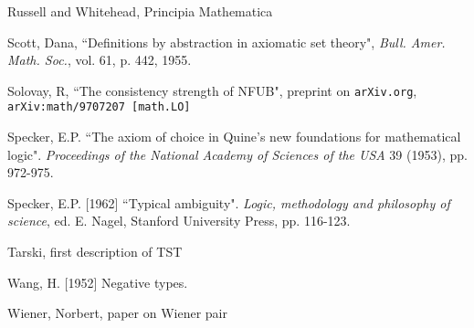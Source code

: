 \documentclass[112pt]{article}
\begin{document}
\begin{thebibliography}{99}
  Russell and Whitehead, Principia Mathematica

  Scott, Dana, ``Definitions by abstraction in axiomatic set theory",  {\em Bull. Amer. Math.
Soc.}, vol. 61, p. 442, 1955.

  Solovay, R, ``The consistency strength of NFUB",  preprint on {\tt arXiv.org}, {\tt arXiv:math/9707207 [math.LO]}

  Specker, E.P.
``The axiom of choice in Quine's new foundations for mathematical logic". 
{\em Proceedings of the National Academy of Sciences of the USA\/} 39 (1953), pp. 972-975.

  Specker, E.P. [1962] 
``Typical ambiguity". 
{\em Logic, methodology and philosophy of science\/}, ed. E. Nagel, Stanford University Press, pp. 116-123.

  Tarski, first description of TST

  Wang, H. [1952] 
Negative types.

  Wiener, Norbert, paper on Wiener pair


\end{thebibliography}
\end{document}

